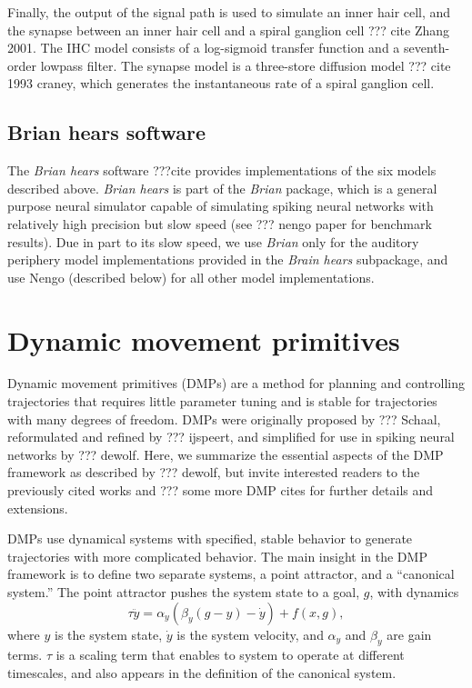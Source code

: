 Finally, the output of the signal path
is used to simulate an inner hair cell,
and the synapse between an inner hair cell
and a spiral ganglion cell
??? cite Zhang 2001.
The IHC model
consists of a log-sigmoid transfer function
and a seventh-order lowpass filter.
The synapse model is a three-store
diffusion model ??? cite 1993 craney,
which generates the instantaneous
rate of a spiral ganglion cell.

\subsection{Brian hears software}

The \textit{Brian hears} software
???cite
provides implementations
of the six models described above.
\textit{Brian hears} is part of the
\textit{Brian} package,
which is a general purpose
neural simulator capable
of simulating spiking neural networks
with relatively high precision
but slow speed
(see ??? nengo paper for benchmark results).
Due in part to its slow speed,
we use \textit{Brian} only for
the auditory periphery model implementations
provided in the \textit{Brain hears} subpackage,
and use Nengo (described below)
for all other model implementations.

\section{Dynamic movement primitives}

Dynamic movement primitives (DMPs)
are a method for planning and controlling trajectories
that requires little parameter tuning
and is stable for trajectories
with many degrees of freedom.
DMPs were originally proposed by ??? Schaal,
reformulated and refined by ??? ijspeert,
and simplified for use in spiking neural networks
by ??? dewolf.
Here, we summarize the essential aspects
of the DMP framework as described by ??? dewolf,
but invite interested readers to
the previously cited works
and ??? some more DMP cites
for further details and extensions.

DMPs use dynamical systems
with specified, stable behavior
to generate trajectories
with more complicated behavior.
The main insight in the DMP framework
is to define two separate systems,
a point attractor,
and a ``canonical system.''
The point attractor pushes
the system state to
a goal, $g$, with dynamics
\begin{equation}
  \label{dmp-pointattractor}
  \tau\ddot{y} = \alpha_y(\beta_y(g - y) - \dot{y}) + f(x, g),
\end{equation}
where $y$ is the system state,
$\dot{y}$ is the system velocity,
and $\alpha_y$ and $\beta_y$ are gain terms.
$\tau$ is a scaling term
that enables to system to operate
at different timescales,
and also appears in the definition
of the canonical system.

